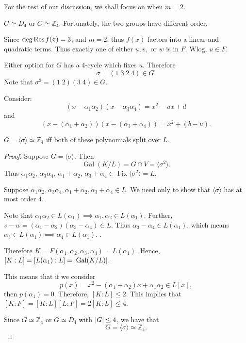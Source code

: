 \documentclass[notoc,notitlepage,nobib]{tufte-book}
\DeclareMathOperator{\Gal}{Gal}
\DeclareMathOperator{\Fix}{Fix}
\begin{document}
For the rest of our discussion, we shall focus on when $m = 2$.

 $G \simeq D_4$ or $G \simeq \mathbb{Z}_4$.
Fortunately, the two groups have different order.

Since $\deg \operatorname{Res} f(x) = 3$, and $m = 2$, thus $f(x)$ factors into a linear and
quadratic terms. Thus exactly one of either $u, v,$ or $w$ is in $F$. Wlog, $u
\in F$.

Either option for $G$ has a $4$-cycle which fixes $u$. Therefore
\begin{equation*}
  \sigma = (1 \; 3 \; 2 \; 4) \in G.
\end{equation*}
Note that $\sigma^2 = (1 \; 2)(3 \; 4) \in G$.

Consider:
\begin{equation*}
  (x - \alpha_1 \alpha_2)(x - \alpha_3 \alpha_4) = x^2 - ux + d
\end{equation*}
and
\begin{equation*}
  (x - ( \alpha_1 + \alpha_2 ))(x - (\alpha_3 + \alpha_4)) = x^2 + (b - u).
\end{equation*}

 $G = \langle \sigma \rangle \simeq \mathbb{Z}_4$ iff both of
these polynomials split over $L$.

\begin{proof}
  \hlbnoted{$(\implies)$} Suppose $G = \langle \sigma \rangle$. Then
  \begin{equation*}
    \Gal(K / L) = G \cap V = \langle \sigma^2 \rangle.
  \end{equation*}
  Thus $\alpha_1 \alpha_2, \, \alpha_3 \alpha_4, \, \alpha_1 + \alpha_2, \,
  \alpha_3 + \alpha_4 \in \Fix \langle \sigma^2 \rangle = L$.

  \noindent
  \hlbnoted{$(\impliedby)$} Suppose $\alpha_1 \alpha_2, \alpha_3 \alpha_4,
  \alpha_1 + \alpha_2, \alpha_3 + \alpha_4 \in L$. We need only to show that
  $\langle \sigma \rangle$ has at most order $4$.

  Note that $\alpha_1 \alpha_2 \in L(\alpha_1) \implies \alpha_1, \alpha_2 \in
  L(\alpha_1)$. Further, $v - w = (\alpha_1 - \alpha_2) (\alpha_3 - \alpha_4)
  \in L$. Thus $\alpha_3 - \alpha_4 \in L(\alpha_1)$, which means $\alpha_3 \in
  L(\alpha_1) \implies \alpha_4 \in L(\alpha_1)$. .

  Therefore $K = F(\alpha_1, \alpha_2, \alpha_3, \alpha_4) = L(\alpha_1)$.
  Hence, $[ K : L ] = [ L(\alpha_1) : L ] = \abs{ \Gal(K / L) }$.

  This means that if we consider
  \begin{equation*}
    p(x) = x^2 - (\alpha_1 + \alpha_2) x + \alpha_1 \alpha_2 \in L[x],
  \end{equation*}
  then $p(\alpha_1) = 0$. Therefore, $[ K : L ] \leq 2$. This implies that $[ K
  : F ] = [ K : L ][ L : F ] = 2 [ K : L ] \leq 4$.

  Since $G \simeq \mathbb{Z}_4$ or $G \simeq D_4$ with $\left|G\right| \leq 4$, we have
  that
  \begin{equation*}
    G = \langle \sigma \rangle \simeq \mathbb{Z}_4.
  \end{equation*}
\end{proof}
\end{document}
